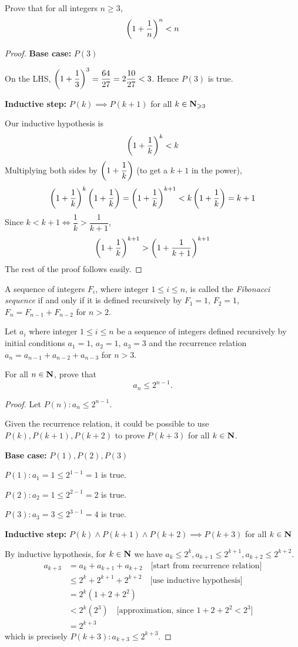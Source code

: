 \begin{prbm}
Prove that for all integers $n \ge 3$, 
\[ \left(1+\frac{1}{n}\right)^n<n \]
\end{prbm}

\begin{proof}
\textbf{Base case:} $P(3)$

On the LHS, $\left(1+\dfrac{1}{3}\right)^3=\dfrac{64}{27}=2\dfrac{10}{27}<3$. Hence $P(3)$ is true.

\textbf{Inductive step:} $P(k)\implies P(k+1)$ for all $k\in\mathbf N_{\geqslant3}$

Our inductive hypothesis is
\[ \left(1+\frac{1}{k}\right)^k<k \]
Multiplying both sides by $\left(1+\dfrac{1}{k}\right)$ (to get a $k+1$ in the power),
\[ \left(1+\frac{1}{k}\right)^k\left(1+\frac{1}{k}\right)=\left(1+\frac{1}{k}\right)^{k+1}<k\left(1+\frac{1}{k}\right)=k+1  \]
Since $k<k+1 \iff \dfrac{1}{k}>\dfrac{1}{k+1}$, 
\[ \left(1+\frac{1}{k}\right)^{k+1} > \left(1+\frac{1}{k+1}\right)^{k+1} \]
The rest of the proof follows easily.
\end{proof}

A sequence of integers $F_i$, where integer $1\le i\le n$, is called the \emph{Fibonacci sequence} if and only if it is defined recursively by $F_1=1$, $F_2=1$, $F_n=F_{n-1}+F_{n-2}$ for $n>2$.

\begin{prbm}
Let $a_i$ where integer $1\le i\le n$ be a sequence of integers defined recursively by initial conditions $a_1=1$, $a_2=1$, $a_3=3$ and the recurrence relation $a_n=a_{n-1}+a_{n-2}+a_{n-3}$ for $n>3$.

For all $n\in\mathbf N$, prove that
\[ a_n\le2^{n-1}. \]
\end{prbm}

\begin{proof}
Let $P(n):a_n\le2^{n-1}$.

Given the recurrence relation, it could be possible to use $P(k),P(k+1),P(k+2)$ to prove $P(k+3)$ for all $k\in\mathbf N$.

\textbf{Base case:} $P(1),P(2),P(3)$

$P(1):a_1=1\le2^{1-1}=1$ is true.

$P(2):a_2=1\le2^{2-1}=2$ is true.

$P(3):a_3=3\le2^{3-1}=4$ is true.

\textbf{Inductive step:} $P(k)\land P(k+1)\land P(k+2)\implies P(k+3)$ for all $k\in\mathbf N$

By inductive hypothesis, for $k\in\mathbf N$ we have $a_k\le2^k, a_{k+1}\le2^{k+1}, a_{k+2}\le2^{k+2}$.
\begin{align*}
a_{k+3} &= a_k+a_{k+1}+a_{k+2} \quad \text{[start from recurrence relation]} \\
&\le 2^k+2^{k+1}+2^{k+2} \quad \text{[use inductive hypothesis]} \\
&= 2^k(1+2+2^2) \\
&< 2^k(2^3) \quad \text{[approximation, since $1+2+2^2<2^3$]} \\
&= 2^{k+3}
\end{align*}
which is precisely $P(k+3):a_{k+3}\le2^{k+3}$.
\end{proof}

